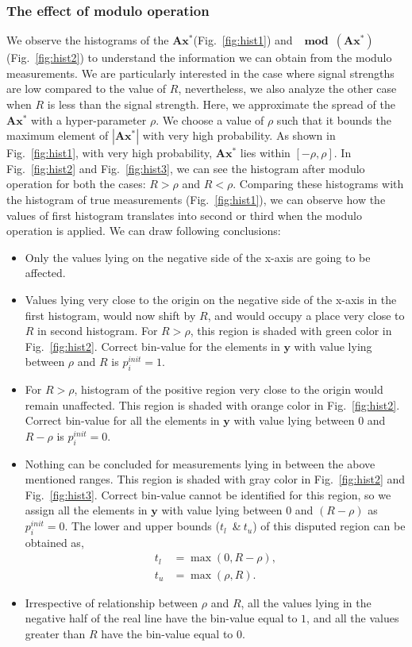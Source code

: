 \subsubsection{The effect of modulo operation} 
\label{sec:modeff}
We observe the histograms of the $\mathbf{Ax^*}$(Fig.~\ref{fig:hist1}) and $\mathbf{\mod(\mathbf{Ax^*})}$(Fig.~\ref{fig:hist2}) to understand the information we can obtain from the modulo measurements. We are particularly interested in the case where signal strengths are low compared to the value of $R$, nevertheless, we also analyze the other case when $R$ is less than the signal strength. Here, we approximate the spread of the $\mathbf{Ax^*}$ with a hyper-parameter $\rho$. We choose a value of $\rho$ such that it bounds the maximum element of $|\mathbf{Ax^*}|$ with very high probability. As shown in Fig.~\ref{fig:hist1}, with very high probability, $\mathbf{Ax^*}$ lies within $[-\rho, \rho]$.
In Fig.~\ref{fig:hist2} and Fig.~\ref{fig:hist3}, we can see the histogram after modulo operation for both the cases: $R>\rho$ and $R<\rho$. Comparing these histograms with the histogram of true measurements (Fig.~\ref{fig:hist1}), we can observe how the values of first histogram translates into second or third when the modulo operation is applied. We can draw following conclusions:
\begin{itemize}
	\item Only the values lying on the negative side of the x-axis are going to be affected.
	\item Values lying very close to the origin on the negative side of the x-axis in the first histogram, would now shift by $R$, and would occupy a place very close to $R$ in second histogram. For $R>\rho$, this region is shaded with green color in Fig.~\ref{fig:hist2}. Correct bin-value for the elements in $\mathbf{y}$ with value lying between $\rho$ and $R$ is $p^{init}_{i} = 1$.
	\item For $R>\rho$, histogram of the positive region very close to the origin would remain unaffected. This region is shaded with orange color in Fig.~\ref{fig:hist2}. Correct bin-value for all the elements in $\mathbf{y}$ with value lying between $0$ and $R-\rho$ is $p^{init}_{i} = 0$.
	\item Nothing can be concluded for measurements lying in between the above mentioned ranges. This region is shaded with gray color in Fig.~\ref{fig:hist2} and Fig.~\ref{fig:hist3}. Correct bin-value cannot be identified for this region, so we assign all the elements in $\mathbf{y}$ with value lying between $0$ and $(R-\rho)$ as $p^{init}_{i} = 0$. The lower and upper bounds ($t_l$~\&$~t_u$) of this disputed region can be obtained as, 
	\begin{align*}
	t_l & = \max(0, R-\rho), \\
	t_u & = \max(\rho, R).
	\end{align*}
	\item Irrespective of relationship between $\rho$ and $R$, all the values lying in the negative half of the real line have the bin-value equal to $1$, and all the values greater than $R$ have the bin-value equal to $0$.
\end{itemize}

